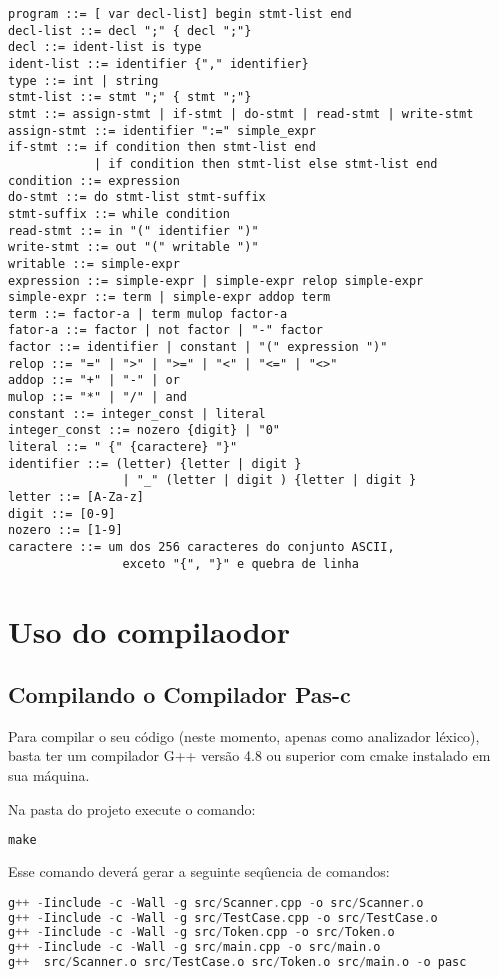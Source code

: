 \documentclass[11pt]{article}
\begin{document}
		\begin{lstlisting}
program ::= [ var decl-list] begin stmt-list end
decl-list ::= decl ";" { decl ";"}
decl ::= ident-list is type
ident-list ::= identifier {"," identifier}
type ::= int | string
stmt-list ::= stmt ";" { stmt ";"}
stmt ::= assign-stmt | if-stmt | do-stmt | read-stmt | write-stmt
assign-stmt ::= identifier ":=" simple_expr
if-stmt ::= if condition then stmt-list end 
			| if condition then stmt-list else stmt-list end
condition ::= expression
do-stmt ::= do stmt-list stmt-suffix
stmt-suffix ::= while condition
read-stmt ::= in "(" identifier ")"
write-stmt ::= out "(" writable ")"
writable ::= simple-expr
expression ::= simple-expr | simple-expr relop simple-expr
simple-expr ::= term | simple-expr addop term
term ::= factor-a | term mulop factor-a
fator-a ::= factor | not factor | "-" factor
factor ::= identifier | constant | "(" expression ")"
relop ::= "=" | ">" | ">=" | "<" | "<=" | "<>"
addop ::= "+" | "-" | or
mulop ::= "*" | "/" | and
constant ::= integer_const | literal
integer_const ::= nozero {digit} | "0"
literal ::= " {" {caractere} "}"
identifier ::= (letter) {letter | digit } 
				| "_" (letter | digit ) {letter | digit }
letter ::= [A-Za-z]
digit ::= [0-9]
nozero ::= [1-9]
caractere ::= um dos 256 caracteres do conjunto ASCII, 
				exceto "{", "}" e quebra de linha
		\end{lstlisting}

\newpage
\section{Uso do compilaodor}

	
	\subsection{Compilando o Compilador Pas-c}

		Para compilar o seu código (neste momento, apenas como analizador léxico), basta ter um compilador G++ versão 4.8 ou superior com cmake instalado em sua máquina.
		
		Na pasta do projeto execute o comando:
\begin{lstlisting}[language=C++]
make
\end{lstlisting} 
		
		Esse comando deverá gerar a seguinte seqûencia de comandos:
\begin{lstlisting}[language=C++]
g++ -Iinclude -c -Wall -g src/Scanner.cpp -o src/Scanner.o
g++ -Iinclude -c -Wall -g src/TestCase.cpp -o src/TestCase.o
g++ -Iinclude -c -Wall -g src/Token.cpp -o src/Token.o
g++ -Iinclude -c -Wall -g src/main.cpp -o src/main.o
g++  src/Scanner.o src/TestCase.o src/Token.o src/main.o -o pasc
\end{lstlisting}
		
\end{document}
